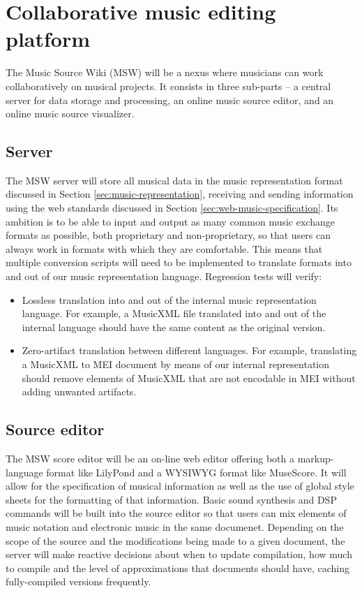 \documentclass{article}
\begin{document}
\section{Collaborative music editing platform}\label{sec:collaborative-music-editing-platform}
The Music Source Wiki (MSW) will be a nexus where
musicians can work collaboratively on musical projects. It consists in three
sub-parts -- a central server for data storage and processing, an online
music source editor, and an online music source visualizer.
\subsection{Server}
The MSW server will store all musical data in the music representation format
discussed in Section \ref{sec:music-representation}, receiving and sending
information using the web standards discussed in Section
\ref{sec:web-music-specification}.  Its ambition is to be able to input and
output as many common music exchange formats as possible, both proprietary and
non-proprietary, so that users can always work in formats with which they are
comfortable.  This means that multiple conversion scripts will need to be
implemented to translate formats into and out of our music representation
language.  Regression tests will verify:
\begin{itemize}
\item Lossless translation into and out of the internal music representation
language. For example, a MusicXML file translated into and out of the
internal language should have the same content as the original version.
\item Zero-artifact translation between different languages. For example,
translating a MusicXML to MEI document by means of our internal
representation should remove elements of MusicXML that are not encodable in MEI
without adding unwanted artifacts.
\end{itemize}
\subsection{Source editor}
The MSW score editor will be an on-line web editor offering both a
markup-language format like LilyPond and a WYSIWYG format like MuseScore.
It will allow for the specification of musical information as well as the
use of global style sheets for the formatting of that information.
Basic sound synthesis and DSP commands will be built into the source editor
so that users can mix elements of music notation and electronic music in the same
documenet. Depending
on the scope of the source and the modifications being made to a given
document, the
server will make reactive decisions about when to update compilation, how
much to compile and the level of approximations that documents should have,
caching fully-compiled versions frequently.\par
\end{document}
